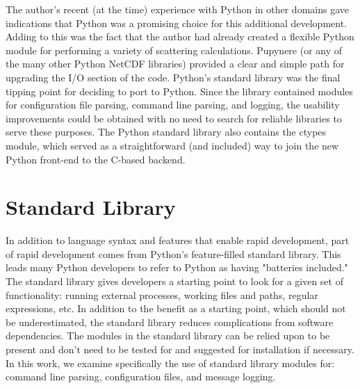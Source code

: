 \documentclass[twocolumn]{article}
\begin{document}
The author's recent (at the time) experience with Python in other domains gave
indications that Python was a promising choice for this additional development.
Adding to this was the fact that the author had already created a flexible Python
module for performing a variety of scattering calculations. Pupynere (or any
of the many other Python NetCDF libraries) provided a clear and simple path
for upgrading the I/O section of the code. Python's standard
library was the final tipping point for deciding to port to Python. Since the
library contained modules for configuration file parsing, command line parsing,
and logging, the usability improvements could be obtained with no need to search
for reliable libraries to serve these purposes. The Python standard library also
contains the ctypes module, which served as a straightforward (and included) way
to join the new Python front-end to the C-based backend.


\section{Standard Library}
In addition to language syntax and features that enable rapid development, part of 
rapid development comes from Python's feature-filled standard library. This leads
many Python developers to refer to Python as having "batteries included." The standard
library gives developers a starting point to look for a given set of functionality: 
running external processes, working files and paths, regular expressions, etc. In addition
to the benefit as a starting point, which should not be underestimated, the standard
library reduces complications from software dependencies. The modules in the standard
library can be relied upon to be present and don't need to be tested for and suggested
for installation if necessary. In this work, we examine specifically the use of
standard library modules for: command line parsing, configuration files, and message logging.
\end{document}
